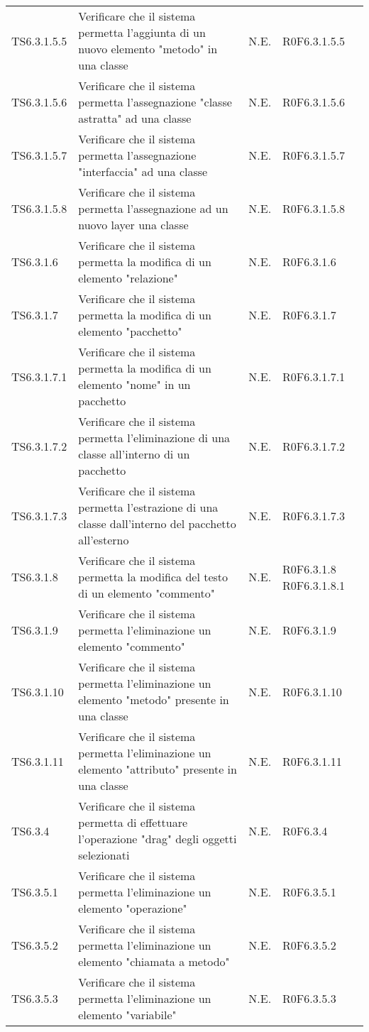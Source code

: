\begin{longtable}{p{2.5cm}!{\VRule[1pt]}p{6.5cm}!{\VRule[1pt]}p{1cm}!{\VRule[1pt]}p{3cm}}
TS6.3.1.5.5 & Verificare che il sistema permetta l'aggiunta di un nuovo elemento "metodo" in una classe & N.E. & R0F6.3.1.5.5\\
TS6.3.1.5.6 & Verificare che il sistema permetta l'assegnazione "classe astratta" ad una classe & N.E. & R0F6.3.1.5.6\\
TS6.3.1.5.7 & Verificare che il sistema permetta l'assegnazione "interfaccia" ad una classe & N.E. & R0F6.3.1.5.7\\
TS6.3.1.5.8 & Verificare che il sistema permetta l'assegnazione ad un nuovo layer una classe & N.E. & R0F6.3.1.5.8\\
TS6.3.1.6 & Verificare che il sistema permetta la modifica di un elemento "relazione" & N.E. & R0F6.3.1.6\\
TS6.3.1.7 & Verificare che il sistema permetta la modifica di un elemento "pacchetto" & N.E. & R0F6.3.1.7\\
TS6.3.1.7.1 & Verificare che il sistema permetta la modifica di un elemento "nome" in un pacchetto & N.E. & R0F6.3.1.7.1\\
TS6.3.1.7.2 & Verificare che il sistema permetta l'eliminazione di una classe all'interno di un pacchetto & N.E. & R0F6.3.1.7.2\\
TS6.3.1.7.3 & Verificare che il sistema permetta l'estrazione di una classe dall'interno del pacchetto all'esterno & N.E. & R0F6.3.1.7.3\\
TS6.3.1.8 & Verificare che il sistema permetta la modifica del testo di un elemento "commento" & N.E. & R0F6.3.1.8 R0F6.3.1.8.1\\
TS6.3.1.9 & Verificare che il sistema permetta l'eliminazione un elemento "commento" & N.E. & R0F6.3.1.9\\
TS6.3.1.10 & Verificare che il sistema permetta l'eliminazione un elemento "metodo" presente in una classe & N.E. & R0F6.3.1.10\\
TS6.3.1.11 & Verificare che il sistema permetta l'eliminazione un elemento "attributo" presente in una classe & N.E. & R0F6.3.1.11\\
TS6.3.4 & Verificare che il sistema permetta di effettuare l'operazione "drag" degli oggetti selezionati & N.E. & R0F6.3.4\\
TS6.3.5.1 & Verificare che il sistema permetta l'eliminazione un elemento "operazione" & N.E. & R0F6.3.5.1\\
TS6.3.5.2 & Verificare che il sistema permetta l'eliminazione un elemento "chiamata a metodo" & N.E. & R0F6.3.5.2\\
TS6.3.5.3 & Verificare che il sistema permetta l'eliminazione un elemento "variabile" & N.E. & R0F6.3.5.3\\

\end{longtable}
